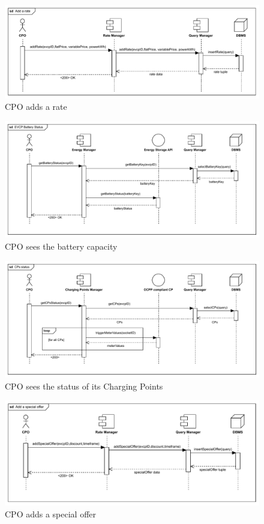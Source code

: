 \begin{figure}[H]
    \centering
    \includegraphics[scale=0.55]{src/runtimeVIew/CPMS_addRate.pdf}
    \caption{CPO adds a rate}
\end{figure}

\begin{figure}[H]
    \centering
    \includegraphics[scale=0.55]{src/runtimeVIew/CPMS_batteryCapacity.pdf}
    \caption{CPO sees the battery capacity}
\end{figure}

\begin{figure}[H]
    \centering
    \includegraphics[scale=0.55]{src/runtimeVIew/CPMS_CPsStatus.pdf}
    \caption{CPO sees the status of its Charging Points}
\end{figure}

\begin{figure}[H]
    \centering
    \includegraphics[scale=0.55]{src/runtimeVIew/CPMS_specialOffer.pdf}
    \caption{CPO adds a special offer}
\end{figure}

